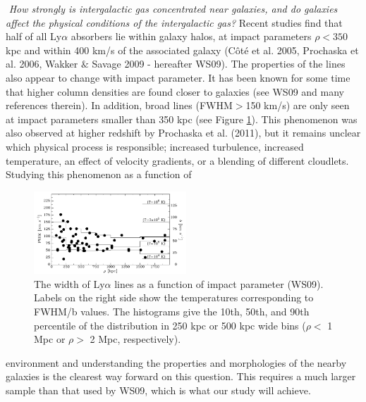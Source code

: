 \documentclass[iop]{emulateapj-rtx4}
\begin{document}
\vspace{10pt}
\indent \textbullet $ $ \textit{How strongly is intergalactic gas concentrated near galaxies, and do galaxies affect the physical conditions of the intergalactic gas?} Recent studies find that half of all Ly$\alpha$ absorbers lie within galaxy halos, at impact parameters $\rho<350$kpc and within 400 km/s of the associated galaxy (C\^{o}t\'{e} et al. 2005, Prochaska et al. 2006, Wakker $\&$ Savage 2009 - hereafter WS09). The properties of the lines also appear to change with impact parameter. It has been known for some time that higher column densities are found closer to galaxies (see WS09 and many references therein). In addition, broad lines (FWHM$>$150 km/s) are only seen at impact parameters smaller than 350 kpc (see Figure \ref{moneyplot}).  This phenomenon was also observed at higher redshift by Prochaska et al. (2011), but it remains unclear which physical process is responsible; increased turbulence, increased temperature, an effect of velocity gradients, or a blending of different cloudlets. Studying this phenomenon as a function of 
\begin{figure}[h!]
  \centering
  \includegraphics[width=0.51\textwidth]{bart_moneyplot}
  \vspace{-5pt}
  \caption{\small{The width of Ly$\alpha$ lines as a function of impact parameter (WS09). Labels on the right side show the temperatures corresponding to FWHM/b values. The histograms give the 10th, 50th, and 90th percentile of the distribution in 250 kpc or 500 kpc wide bins ($\rho <$ 1 Mpc or $\rho >$ 2 Mpc, respectively).}}
  \vspace{5pt}
  \label{moneyplot}
\end{figure} environment and understanding the properties and morphologies of the nearby galaxies is the clearest way forward on this question. This requires a much larger sample than that used by WS09, which is what our study will achieve. 
\end{document}
